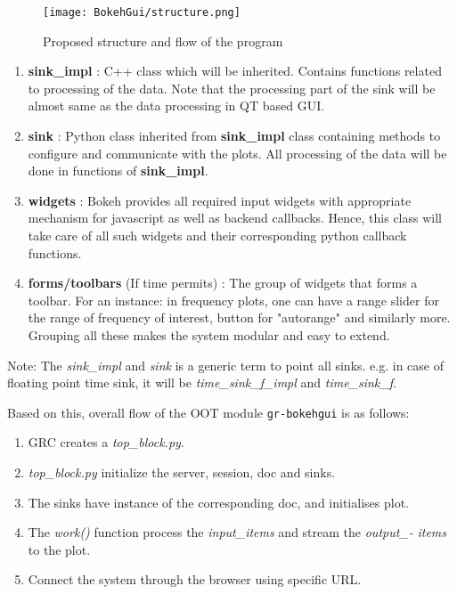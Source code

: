 \documentclass[a4paper, 11pt]{article}
\begin{document}
\begin{figure}[t]
\texttt{[image: BokehGui/structure.png]}
\caption{Proposed structure and flow of the program}
\label{fig:two}
\end{figure}

\begin{enumerate}
\item \textbf{sink\_impl} : C++ class which will be inherited. Contains functions related to processing of the data. Note that the processing part of the sink will be almost same as the data processing in QT based GUI.
\item \textbf{sink }: Python class inherited from \textbf{sink\_impl }class containing methods to configure and communicate with the plots. All processing of the data will be done in functions of \textbf{sink\_impl}.
\item \textbf{widgets }: Bokeh provides all required input widgets with appropriate mechanism for javascript as well as backend callbacks. Hence, this class will take care of all such widgets and their corresponding python callback functions.
\item \textbf{forms/toolbars} (If time permits) : The group of widgets that forms a toolbar. For an instance: in frequency plots, one can have a range slider for the range of frequency of interest, button for "autorange" and similarly more. Grouping all these makes the system modular and easy to extend.
\end{enumerate}

Note: The \textit{sink\_impl }and \textit{sink }is a generic term to point all sinks. e.g. in case of floating point time sink, it will be \textit{time\_sink\_f\_impl }and \textit{time\_sink\_f}.

Based on this, overall flow of the OOT module \texttt{gr-bokehgui} is as follows:
\begin{enumerate}
\item GRC creates a \textit{top\_block.py}.
\item \textit{top\_block.py }initialize the server, session, doc and sinks.
\item The sinks have instance of the corresponding doc, and initialises plot.
\item The \textit{work()} function process the \textit{input\_items} and stream the \textit{output\_- }\textit{items} to the plot.
\item Connect the system through the browser using specific URL.
\end{enumerate}
\end{document}

